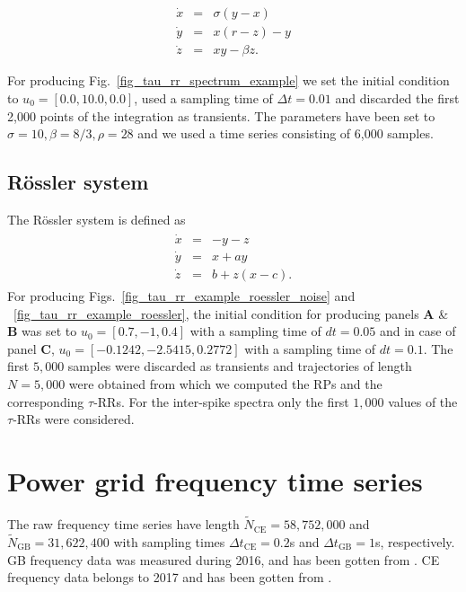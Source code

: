 \documentclass[entropy,article,submit,pdftex,moreauthors]{Definitions/mdpi}
\begin{document}
\begin{equation}
\begin{array}{rcl}
\dot{x}&=&\sigma(y-x) \\
\dot{y}&=&x(r-z)-y \\
\dot{z}&=&xy - \beta z.
\end{array}
\label{eq_model_Lorenz63}
\end{equation}

\noindent For producing Fig.~\ref{fig_tau_rr_spectrum_example} we set the initial condition to $u_0=[0.0, 10.0, 0.0]$, used a sampling time of $\Delta t=0.01$ and discarded the first 
2,000 points of the integration as transients. The parameters have been set to 
$\sigma=10, \beta=8/3, \rho=28$ and we used a time series consisting of 6,000 samples.

\subsection{R\"ossler system}\label{sec_models_roessler}

\noindent The R\"ossler system \cite{roessler1976} is defined as
\begin{align}
\begin{array}{rcl}
\dot{x}&=&-y-z \\
\dot{y}&=&x+ay \\
\dot{z}&=&b+ z(x-c) .
\end{array}
\label{eq_model_roessler}
\end{align}
For producing Figs.~\ref{fig_tau_rr_example_roessler_noise} and ~\ref{fig_tau_rr_example_roessler}, the initial condition for producing panels \textbf{A} \& \textbf{B} was set to $u_0=[0.7, -1, 0.4]$ with a sampling time 
of $dt=0.05$ and in case of panel \textbf{C}, $u_0=[-0.1242, -2.5415, 0.2772]$ with a sampling time of $dt=0.1$. The first $5,000$ samples were discarded as transients and trajectories of length $N=5,000$ were 
obtained from which we computed the RPs and the corresponding $\tau$-RRs. For the inter-spike spectra only the first $1,000$ values of the $\tau$-RRs were considered.

\section{Power grid frequency time series}\label{sec_power_grid_appendix}

The raw frequency time series have length $\tilde{N}_{\text{CE}}=58,752,000$ and $\tilde{N}_{\text{GB}}=31,622,400$ with sampling times $\Delta t_{\text{CE}}=0.2$\si{s} and 
$\Delta t_{\text{GB}}=1$\si{s}, respectively. GB frequency data was measured during 2016, and has been gotten from \cite{GB}. CE frequency data belongs to 2017 and has been gotten from \cite{haehne2018footprint}.
  
\end{document}
